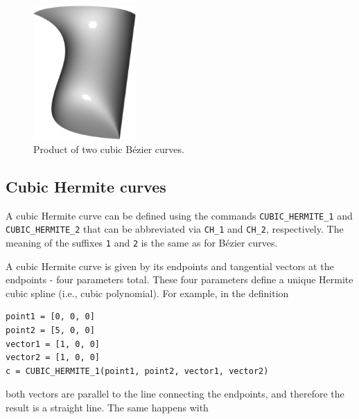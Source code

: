 \begin{figure}[!ht]
\begin{center}
\includegraphics[width=0.35\textwidth]{img/curves-13.png}
\end{center}
\vspace{-4mm}
\caption{Product of two cubic B\'ezier curves.}
\label{fig:curves-13}
\end{figure}

\subsection{Cubic Hermite curves}

A cubic Hermite curve can be defined using the commands 
{\tt CUBIC\_HERMITE\_1} and {\tt CUBIC\_HERMITE\_2} that 
can be abbreviated via {\tt CH\_1} and {\tt CH\_2}, respectively.
The meaning of the suffixes {\tt 1} and {\tt 2} is the same as 
for B\'ezier curves. 

A cubic Hermite curve is given by its 
endpoints and tangential vectors at the 
endpoints - four parameters total. These four parameters 
define a unique Hermite cubic spline (i.e., cubic polynomial). 
For example, in the definition\\

\begin{bbox}
\begin{verbatim}
point1 = [0, 0, 0]
point2 = [5, 0, 0]
vector1 = [1, 0, 0]
vector2 = [1, 0, 0]
c = CUBIC_HERMITE_1(point1, point2, vector1, vector2)
\end{verbatim}
\end{bbox}
\vspace{6mm}

\noindent
both vectors are parallel to the line connecting the endpoints,
and therefore the result is a straight line. The same happens 
with  \\

